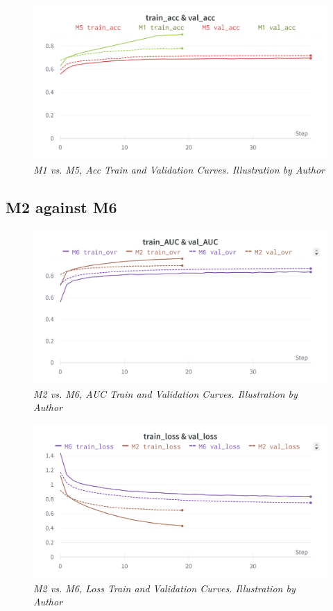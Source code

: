 \begin{figure}[H]
\centering
    \includegraphics[width=\textwidth]{imatges/results/AccM1M5.png}
\caption[M1 vs. M5, Acc Train and Validation Curves]{\textit{M1 vs. M5, Acc Train and Validation Curves. Illustration by Author}}
\end{figure}


\subsection{M2 against M6}

\begin{figure}[H]
\centering
    \includegraphics[width=\textwidth]{imatges/results/AUCM2M6.png}
\caption[M2 vs. M6, AUC Train and Validation Curves]{\textit{M2 vs. M6, AUC Train and Validation Curves. Illustration by Author}}
\end{figure}

\newpage

\begin{figure}[H]
\centering
    \includegraphics[width=\textwidth]{imatges/results/LossM2M6.png}
\caption[M2 vs. M6, Loss Train and Validation Curves]{\textit{M2 vs. M6, Loss Train and Validation Curves. Illustration by Author}}
\end{figure}


